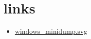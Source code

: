 \section{links}

\begin{itemize}
    \item \href{https://formats.kaitai.io/windows_minidump/windows_minidump.svg}{windows_minidump.svg}
\end{itemize}
